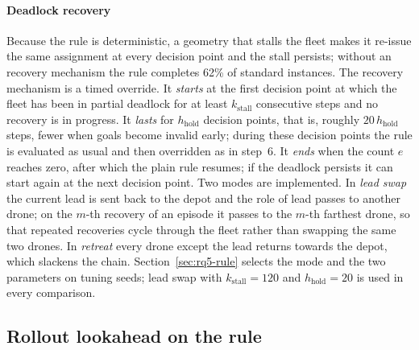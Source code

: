 \documentclass[final,5p,times,twocolumn]{elsarticle}
\begin{document}
\paragraph{Deadlock recovery}
Because the rule is deterministic, a geometry that stalls the fleet makes it re-issue the same
assignment at every decision point and the stall persists; without an recovery mechanism the rule
completes 62\% of standard instances. The recovery mechanism is a timed override. It \emph{starts}
at the first decision point at which the fleet has been in partial deadlock for at least
$k_{\mathrm{stall}}$ consecutive steps and no recovery is in progress. It \emph{lasts} for
$h_{\mathrm{hold}}$ decision points, that is, roughly $20\,h_{\mathrm{hold}}$ steps, fewer when
goals become invalid early; during these decision points the rule is evaluated as usual and then
overridden as in step~6. It \emph{ends} when the count $e$ reaches zero, after which the plain
rule resumes; if the deadlock persists it can start again at the next decision point. Two modes
are implemented. In \emph{lead swap} the current lead is sent back to the depot and the role of
lead passes to another drone; on the $m$-th recovery of an episode it passes to the $m$-th farthest
drone, so that repeated recoveries cycle through the fleet rather than swapping the same two drones.
In \emph{retreat} every drone except the lead returns towards the depot, which slackens the
chain. Section~\ref{sec:rq5-rule} selects the mode and the two parameters on tuning seeds;
lead swap with $k_{\mathrm{stall}} = 120$ and $h_{\mathrm{hold}} = 20$ is used in every comparison.

\subsection{Rollout lookahead on the rule}
\label{sec:lookahead}
\end{document}
